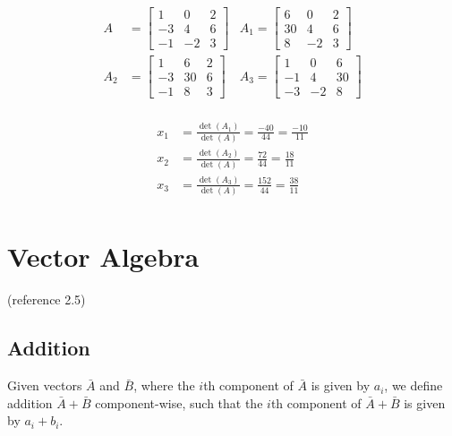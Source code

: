 \documentclass[
]{book}
\begin{document}
\begin{align}
A &= \begin{bmatrix} 1 & 0 & 2 \\ -3 & 4 & 6 \\ -1 & -2 & 3 \end{bmatrix} & A_1 = \begin{bmatrix} 6 & 0 & 2 \\ 30 & 4 & 6 \\ 8 & -2 & 3 \end{bmatrix} \\
A_2 &= \begin{bmatrix} 1 & 6 & 2 \\ -3 & 30 & 6 \\ -1 & 8 & 3 \end{bmatrix} & A_3 = \begin{bmatrix} 1 & 0 & 6 \\ -1 & 4 & 30 \\ -3 & -2 & 8 \end{bmatrix} \\
\end{align}

\begin{align}
x_1 &= \frac{\det\left( A_1 \right)}{\det\left( A \right)} = \frac{-40}{44} = \frac{-10}{11} \\
x_2 &= \frac{\det\left( A_2 \right)}{\det\left( A \right)} = \frac{72}{44} = \frac{18}{11} \\
x_3 &= \frac{\det\left( A_3 \right)}{\det\left( A \right)} = \frac{152}{44} = \frac{38}{11} \\
\end{align}

\hypertarget{vector-algebra}{%
\section{Vector Algebra}\label{vector-algebra}}

(reference 2.5)

\hypertarget{addition}{%
\subsection{Addition}\label{addition}}

Given vectors \(\bar{A}\) and \(\bar{B}\), where the \(i\)th component of \(\bar{A}\) is given by \(a_i\), we define addition \(\bar{A} + \bar{B}\) component-wise, such that the \(i\)th component of \(\bar{A} + \bar{B}\) is given by \(a_i + b_i\).
\end{document}
